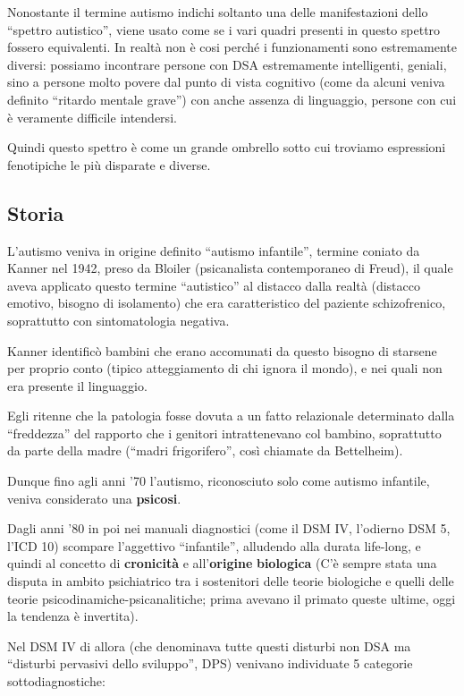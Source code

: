 Nonostante il termine autismo indichi soltanto una delle manifestazioni
dello ``spettro autistico'', viene usato come se i vari quadri presenti
in questo spettro fossero equivalenti. In realtà non è cosi perché i
funzionamenti sono estremamente diversi: possiamo incontrare persone con
DSA estremamente intelligenti, geniali, sino a persone molto povere dal
punto di vista cognitivo (come da alcuni veniva definito ``ritardo
mentale grave'') con anche assenza di linguaggio, persone con cui è
veramente difficile intendersi.

Quindi questo spettro è come un grande ombrello sotto cui troviamo
espressioni fenotipiche le più disparate e diverse.

\subsection{Storia}

L'autismo veniva in origine definito ``autismo infantile'', termine
coniato da Kanner nel 1942, preso da Bloiler (psicanalista contemporaneo
di Freud), il quale aveva applicato questo termine ``autistico'' al
distacco dalla realtà (distacco emotivo, bisogno di isolamento) che era
caratteristico del paziente schizofrenico, soprattutto con
sintomatologia negativa.

Kanner identificò bambini che erano accomunati da questo bisogno di
starsene per proprio conto (tipico atteggiamento di chi ignora il
mondo), e nei quali non era presente il linguaggio.

Egli ritenne che la patologia fosse dovuta a un fatto relazionale
determinato dalla ``freddezza'' del rapporto che i genitori
intrattenevano col bambino, soprattutto da parte della madre (``madri
frigorifero'', così chiamate da Bettelheim).

Dunque fino agli anni '70 l'autismo, riconosciuto solo come autismo
infantile, veniva considerato una \textbf{psicosi}.

Dagli anni '80 in poi nei manuali diagnostici (come il DSM IV, l'odierno
DSM 5, l'ICD 10) scompare l'aggettivo ``infantile'', alludendo alla
durata life-long, e quindi al concetto di \textbf{cronicità} e
all'\textbf{origine} \textbf{biologica} (C'è sempre stata una disputa in
ambito psichiatrico tra i sostenitori delle teorie biologiche e quelli
delle teorie psicodinamiche-psicanalitiche; prima avevano il primato
queste ultime, oggi la tendenza è invertita).

Nel DSM IV di allora (che denominava tutte questi disturbi non DSA ma
``disturbi pervasivi dello sviluppo'', DPS) venivano individuate 5
categorie sottodiagnostiche:

